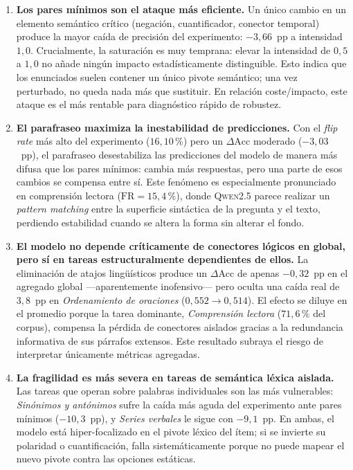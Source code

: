 \documentclass[11pt]{article}
\begin{document}
\begin{enumerate}

    \item \textbf{Los pares mínimos son el ataque más eficiente.}
    Un único cambio en un elemento semántico crítico
    (negación, cuantificador, conector temporal)
    produce la mayor caída de precisión del experimento: $-3{,}66$~pp a
    intensidad $1{,}0$. Crucialmente, la saturación es muy temprana: elevar la
    intensidad de $0{,}5$ a $1{,}0$ no añade ningún impacto estadísticamente
    distinguible. Esto indica que los enunciados suelen contener un único pivote
    semántico; una vez perturbado, no queda nada más que sustituir.
    En relación coste/impacto, este ataque es el más rentable para diagnóstico
    rápido de robustez.

    \item \textbf{El parafraseo maximiza la inestabilidad de predicciones.}
    Con el \textit{flip rate} más alto del experimento ($16{,}10\,\%$) pero un
    $\Delta\text{Acc}$ moderado ($-3{,}03$~pp), el parafraseo desestabiliza las
    predicciones del modelo de manera más difusa que los pares mínimos: cambia
    más respuestas, pero una parte de esos cambios se compensa entre sí.
    Este fenómeno es especialmente pronunciado en comprensión lectora
    ($\text{FR} = 15{,}4\,\%$), donde \textsc{Qwen2.5} parece realizar un
    \textit{pattern matching} entre la superficie sintáctica de la pregunta y el
    texto, perdiendo estabilidad cuando se altera la forma sin alterar el fondo.

    \item \textbf{El modelo no depende críticamente de conectores lógicos en global,
    pero sí en tareas estructuralmente dependientes de ellos.}
    La eliminación de atajos lingüísticos produce un $\Delta\text{Acc}$ de apenas
    $-0{,}32$~pp en el agregado global ---aparentemente inofensivo--- pero oculta
    una caída real de $3{,}8$~pp en \textit{Ordenamiento de oraciones} ($0{,}552
    \to 0{,}514$). El efecto se diluye en el promedio porque la tarea
    dominante, \textit{Comprensión lectora} ($71{,}6\,\%$ del corpus), compensa
    la pérdida de conectores aislados gracias a la redundancia informativa de sus
    párrafos extensos. Este resultado subraya el riesgo de interpretar únicamente
    métricas agregadas.

    \item \textbf{La fragilidad es más severa en tareas de semántica léxica aislada.}
    Las tareas que operan sobre palabras individuales son las más vulnerables:
    \textit{Sinónimos y antónimos} sufre la caída más aguda del experimento ante
    pares mínimos ($-10{,}3$~pp), y \textit{Series verbales} le sigue con
    $-9{,}1$~pp. En ambas, el modelo está hiper-focalizado en el pivote léxico
    del ítem; si se invierte su polaridad o cuantificación, falla sistemáticamente
    porque no puede mapear el nuevo pivote contra las opciones estáticas.

\end{enumerate}


\end{document}
